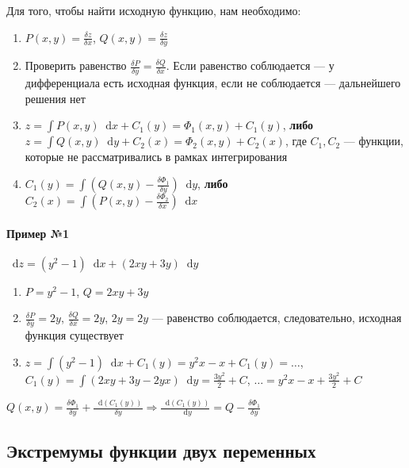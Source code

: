 \documentclass{article}
\newcommand*\diff{\mathop{}\!\mathrm{d}}
\begin{document}
Для того, чтобы найти исходную функцию, нам необходимо:

\begin{enumerate}
    \item $P (x, y) = \frac{\delta z}{\delta x}$, $Q (x, y) = \frac{\delta z}{\delta y}$
    \item Проверить равенство $\frac{\delta P}{\delta y} = \frac{\delta Q}{\delta x}$. Если равенство соблюдается — у дифференциала есть исходная функция, если не соблюдается — дальнейшего решения нет
    \item $z = \int P (x, y) \diff x + C_1 (y) = \Phi_1 (x, y) + C_1 (y)$, \textbf{либо} \\
    $z = \int Q(x, y) \diff y + C_2 (x) = \Phi_2 (x, y) + C_2 (x)$, где $C_1, C_2$ — функции, которые не рассматривались в рамках интегрирования
    \item $C_1 (y) = \int (Q (x, y) - \frac{\delta \Phi_1}{\delta y}) \diff y$, \textbf{либо} \\
    $C_2 (x) = \int (P(x, y) - \frac{\delta \Phi_2}{\delta x}) \diff x$
\end{enumerate}

\paragraph{Пример №1} $\diff z = (y^2 - 1) \diff x + (2 x y + 3 y) \diff y$

\begin{enumerate}
    \item $P = y^2 - 1$, $Q = 2 x y + 3 y$
    \item $\frac{\delta P}{\delta y}  = 2 y$, $\frac{\delta Q}{\delta x} = 2 y$, $2y = 2y$ — равенство соблюдается, следовательно, исходная функция существует
    \item $z = \int (y^2 - 1) \diff x + C_1(y) = y^2 x - x + C_1 (y) = \dots$, \\ $C_1 (y) = \int (2 x y + 3 y - 2 y x) \diff y = \frac{3 y^2}{2} + C$, $\dots = y^2 x - x + \frac{3 y^2}{2} + C$ 
\end{enumerate}

$Q (x, y) = \frac{\delta \Phi_1}{\delta y} + \frac{\diff (C_1 (y))}{\delta y} \Longrightarrow \frac{\diff (C_1 (y))}{\diff y} = Q - \frac{\delta \Phi_1}{\delta y}$

\subsection{Экстремумы функции двух переменных}
\end{document}
